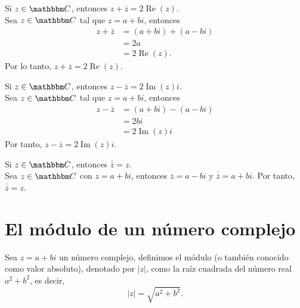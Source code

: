 \begin{proposition}
    Si $z \in \CC$, entonces $z+\overline{z}= 2  \operatorname{Re}(z)$. \\
    \demostracion Sea $z \in \CC$ tal que $z=a+bi$, entonces
    \begin{align*}
        z+\overline{z} &=(a+bi)+(a-bi) \\
        & =2a \\
        & =2  \operatorname{Re}(z).
    \end{align*}
    Por lo tanto, $z+\overline{z}= 2  \operatorname{Re}(z)$.
\end{proposition}

\begin{proposition}
    Si $z \in \CC$, entonces $z-\overline{z}= 2  \operatorname{Im}(z)  i$. \\
    \demostracion Sea $z \in \CC$ tal que $z=a+bi$, entonces
    \begin{align*}
        z-\overline{z} &=(a+bi)-(a-bi) \\
        & =2bi \\
        & =2  \operatorname{Im}(z)  i
    \end{align*}
    Por tanto, $z-\overline{z}= 2  \operatorname{Im}(z)  i$.
\end{proposition}

\begin{proposition}
    Si $z \in \CC$, entonces $\overline{\overline{z}}=z$. \\
    \demostracion Sea $z \in \CC$ con $z=a+bi$, entonces $\overline{z}=a-bi$ y $\overline{\overline{z}}=a+bi$. Por tanto, $ \overline{\overline{z}}=z$.
\end{proposition}

\section{El módulo de un número complejo}

\begin{definition}
    Sea $z=a+bi$ un número complejo, definimos el módulo (o también conocido como valor absoluto), denotado por $|z|$, como la raíz cuadrada del número real $a^2+b^2$, es decir,
    $$|z|=\sqrt{a^2+b^2}.$$
\end{definition}

